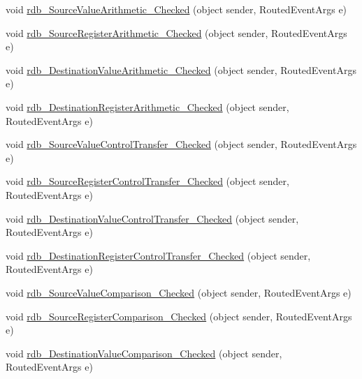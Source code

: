 \begin{DoxyCompactItemize}
void \hyperlink{class_c_p_u___o_s___simulator_1_1_instructions_window_a8a693624b1b25769de9cccfaea819daf}{rdb\+\_\+\+Source\+Value\+Arithmetic\+\_\+\+Checked} (object sender, Routed\+Event\+Args e)
\item 
void \hyperlink{class_c_p_u___o_s___simulator_1_1_instructions_window_aed7531afdb080427f98bc26b5488fd18}{rdb\+\_\+\+Source\+Register\+Arithmetic\+\_\+\+Checked} (object sender, Routed\+Event\+Args e)
\item 
void \hyperlink{class_c_p_u___o_s___simulator_1_1_instructions_window_a41782c6995180cad160c5e8f46ce5739}{rdb\+\_\+\+Destination\+Value\+Arithmetic\+\_\+\+Checked} (object sender, Routed\+Event\+Args e)
\item 
void \hyperlink{class_c_p_u___o_s___simulator_1_1_instructions_window_a4625e511a95aa3cce6550f2b0fd60aea}{rdb\+\_\+\+Destination\+Register\+Arithmetic\+\_\+\+Checked} (object sender, Routed\+Event\+Args e)
\item 
void \hyperlink{class_c_p_u___o_s___simulator_1_1_instructions_window_a05f9924f69791130e674933886386965}{rdb\+\_\+\+Source\+Value\+Control\+Transfer\+\_\+\+Checked} (object sender, Routed\+Event\+Args e)
\item 
void \hyperlink{class_c_p_u___o_s___simulator_1_1_instructions_window_a6f9bce58d8e409879131619b7316b990}{rdb\+\_\+\+Source\+Register\+Control\+Transfer\+\_\+\+Checked} (object sender, Routed\+Event\+Args e)
\item 
void \hyperlink{class_c_p_u___o_s___simulator_1_1_instructions_window_a308ca537f9fb659b301b92c426840088}{rdb\+\_\+\+Destination\+Value\+Control\+Transfer\+\_\+\+Checked} (object sender, Routed\+Event\+Args e)
\item 
void \hyperlink{class_c_p_u___o_s___simulator_1_1_instructions_window_a0abcc3b1c9dbbc04379f35bfc645b58b}{rdb\+\_\+\+Destination\+Register\+Control\+Transfer\+\_\+\+Checked} (object sender, Routed\+Event\+Args e)
\item 
void \hyperlink{class_c_p_u___o_s___simulator_1_1_instructions_window_aa5413c4f240c448298867dfca5474d52}{rdb\+\_\+\+Source\+Value\+Comparison\+\_\+\+Checked} (object sender, Routed\+Event\+Args e)
\item 
void \hyperlink{class_c_p_u___o_s___simulator_1_1_instructions_window_a21a7262f1fc85de3f833bc1a88e1b384}{rdb\+\_\+\+Source\+Register\+Comparison\+\_\+\+Checked} (object sender, Routed\+Event\+Args e)
\item 
void \hyperlink{class_c_p_u___o_s___simulator_1_1_instructions_window_a8d499408578787c03f1e8ce58db03506}{rdb\+\_\+\+Destination\+Value\+Comparison\+\_\+\+Checked} (object sender, Routed\+Event\+Args e)

\end{DoxyCompactItemize}
